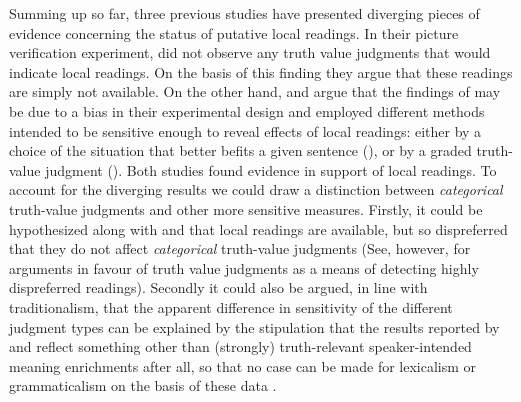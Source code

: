 \documentclass[fleqn,reqno,10pt,draft]{article}
\begin{document}
Summing up so far, three previous studies have presented diverging
pieces of evidence concerning the status of putative local
readings. In their picture verification experiment, \citet{GeurtsPouscoulous2009:Embedded-Implic} did not observe any truth value judgments that would indicate
local readings. On the basis of this finding they argue that these readings are simply not available. On the other
hand,  \citeauthor{CliftonDube2010:Embedded-Implic} and \citeauthor{ChemlaSpector2010:Experimental-Ev} argue that the findings of  \citeauthor{GeurtsPouscoulous2009:Embedded-Implic} may be due to a bias in their experimental design and
employed different methods intended to be sensitive enough to reveal effects of local readings: either by
a choice of the situation that better befits a given sentence (\citeauthor{CliftonDube2010:Embedded-Implic}), or by a graded
truth-value judgment (\citeauthor{ChemlaSpector2010:Experimental-Ev}). Both studies found evidence in support of local readings.
To account for the diverging results we could draw a distinction between \emph{categorical} truth-value
judgments and other more sensitive measures. Firstly, it could be hypothesized
along with \citeauthor{CliftonDube2010:Embedded-Implic} and
\citeauthor{ChemlaSpector2010:Experimental-Ev} that local readings are
available, but so dispreferred that they do not affect
\emph{categorical} truth-value judgments (See, however, \citet{Crain1998} for arguments in favour of truth value judgments
as a means of detecting highly dispreferred readings).
Secondly it could also be argued, in line with traditionalism, that the apparent difference in
sensitivity of the different judgment types can be explained by the stipulation that
the results reported by \citeauthor{CliftonDube2010:Embedded-Implic}
and \citeauthor{ChemlaSpector2010:Experimental-Ev} reflect something other than
(strongly) truth-relevant speaker-intended meaning enrichments after all, so that no case
can be made for lexicalism or grammaticalism on the basis of these data \citep[c.f.][for arguments along these lines]{Tielvan-Tiel2012:Embedded-Scalar}.
\end{document}

